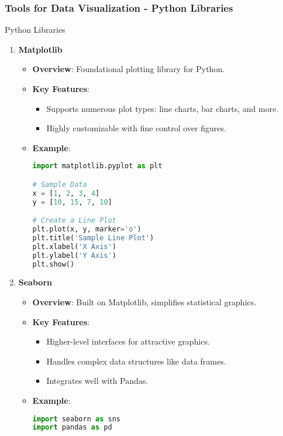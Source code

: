 \documentclass[aspectratio=169]{beamer}
\begin{document}
\begin{frame}[fragile]
    \frametitle{Tools for Data Visualization - Python Libraries}
    \begin{block}{Python Libraries}
        \begin{enumerate}
            \item \textbf{Matplotlib}
                \begin{itemize}
                    \item \textbf{Overview}: Foundational plotting library for Python.
                    \item \textbf{Key Features}:
                        \begin{itemize}
                            \item Supports numerous plot types: line charts, bar charts, and more.
                            \item Highly customizable with fine control over figures.
                        \end{itemize}
                    \item \textbf{Example}:
                    \begin{lstlisting}[language=Python]
import matplotlib.pyplot as plt

# Sample Data
x = [1, 2, 3, 4]
y = [10, 15, 7, 10]

# Create a Line Plot
plt.plot(x, y, marker='o')
plt.title('Sample Line Plot')
plt.xlabel('X Axis')
plt.ylabel('Y Axis')
plt.show()
                    \end{lstlisting}
                \end{itemize}
                
            \item \textbf{Seaborn}
                \begin{itemize}
                    \item \textbf{Overview}: Built on Matplotlib, simplifies statistical graphics.
                    \item \textbf{Key Features}:
                        \begin{itemize}
                            \item Higher-level interfaces for attractive graphics.
                            \item Handles complex data structures like data frames.
                            \item Integrates well with Pandas.
                        \end{itemize}
                    \item \textbf{Example}:
                    \begin{lstlisting}[language=Python]
import seaborn as sns
import pandas as pd


\end{lstlisting}
\end{itemize}
\end{enumerate}
\end{block}
\end{frame}
\end{document}
